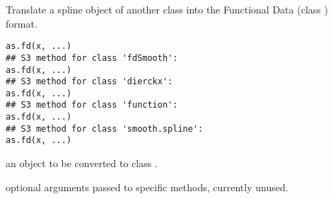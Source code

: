 \documentclass{article}
\begin{document}
\begin{Description}\relax
Translate a spline object of another class into the Functional Data
(class ) format.
\end{Description}
\begin{Usage}
\begin{verbatim}
as.fd(x, ...)
## S3 method for class 'fdSmooth':
as.fd(x, ...)
## S3 method for class 'dierckx':
as.fd(x, ...) 
## S3 method for class 'function':
as.fd(x, ...)
## S3 method for class 'smooth.spline':
as.fd(x, ...) 
\end{verbatim}
\end{Usage}
\begin{Arguments}
\begin{ldescription}
\item[\code{x}] an object to be converted to class .  

\item[\code{...}] optional arguments passed to specific methods, currently unused.  

\end{ldescription}
\end{Arguments}
\end{document}

